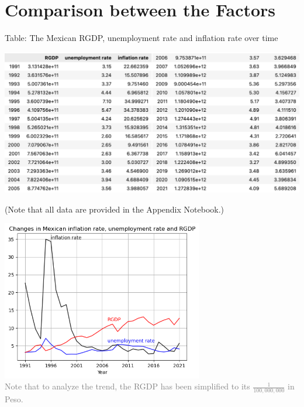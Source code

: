 \documentclass{article}
\begin{document}
\section{Comparison between the Factors}

    \hspace{5mm}{To ensure the statistical precision, the data sets are committed outer merges (all observations must have all three factors available to be remained in the DataFrame). After the merges, we have all available data from 1991 to 2021.}

    \begin{center}
        \small{Table: The Mexican RGDP, unemployment rate and inflation rate over time}\\
        \includegraphics[width=14.84cm, height=7.10cm]{df_all_variable_table.png}\\
        \small{(Note that all data are provided in the Appendix Notebook.)}
    \end{center}
    
\pagebreak

    \begin{center}
        \includegraphics[weidth=9cm, height=7cm]{all_graphs.png}\\
        \textcolor{gray}{\footnotesize{Note that to analyze the trend, the RGDP has been simplified to its $\frac{1}{100,000,000}$ in Peso.}}
    \end{center}
\end{document}
